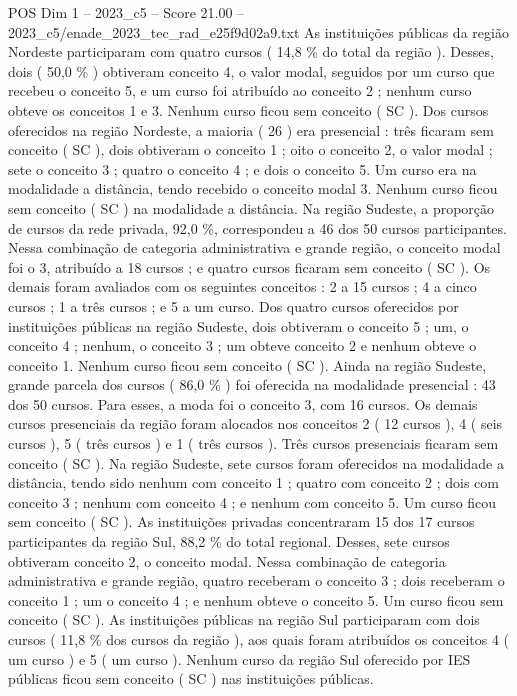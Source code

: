 \begin{textsample}{POS Dim 1 – 2023\_c5 – Score 21.00 – 2023\_c5/enade\_2023\_tec\_rad\_e25f9d02a9.txt}
As instituições públicas da região Nordeste participaram com quatro cursos ( 14,8 \% do total da região ).
Desses, dois ( 50,0 \% ) obtiveram conceito 4, o valor modal, seguidos por um curso que recebeu o conceito 5, e um curso foi atribuído ao conceito 2 ; nenhum curso obteve os conceitos 1 e 3.
Nenhum curso ficou sem conceito ( SC ).
Dos cursos oferecidos na região Nordeste, a maioria ( 26 ) era presencial : três ficaram sem conceito ( SC ), dois obtiveram o conceito 1 ; oito o conceito 2, o valor modal ; sete o conceito 3 ; quatro o conceito 4 ; e dois o conceito 5.
Um curso era na modalidade a distância, tendo recebido o conceito modal 3.
Nenhum curso ficou sem conceito ( SC ) na modalidade a distância.
Na região Sudeste, a proporção de cursos da rede privada, 92,0 \%, correspondeu a 46 dos 50 cursos participantes.
Nessa combinação de categoria administrativa e grande região, o conceito modal foi o 3, atribuído a 18 cursos ; e quatro cursos ficaram sem conceito ( SC ).
Os demais foram avaliados com os seguintes conceitos : 2 a 15 cursos ; 4 a cinco cursos ; 1 a três cursos ; e 5 a um curso.
Dos quatro cursos oferecidos por instituições públicas na região Sudeste, dois obtiveram o conceito 5 ; um, o conceito 4 ; nenhum, o conceito 3 ; um obteve conceito 2 e nenhum obteve o conceito 1.
Nenhum curso ficou sem conceito ( SC ).
Ainda na região Sudeste, grande parcela dos cursos ( 86,0 \% ) foi oferecida na modalidade presencial : 43 dos 50 cursos.
Para esses, a moda foi o conceito 3, com 16 cursos.
Os demais cursos presenciais da região foram alocados nos conceitos 2 ( 12 cursos ), 4 ( seis cursos ), 5 ( três cursos ) e 1 ( três cursos ).
Três cursos presenciais ficaram sem conceito ( SC ).
Na região Sudeste, sete cursos foram oferecidos na modalidade a distância, tendo sido nenhum com conceito 1 ; quatro com conceito 2 ; dois com conceito 3 ; nenhum com conceito 4 ; e nenhum com conceito 5.
Um curso ficou sem conceito ( SC ).
As instituições privadas concentraram 15 dos 17 cursos participantes da região Sul, 88,2 \% do total regional.
Desses, sete cursos obtiveram conceito 2, o conceito modal.
Nessa combinação de categoria administrativa e grande região, quatro receberam o conceito 3 ; dois receberam o conceito 1 ; um o conceito 4 ; e nenhum obteve o conceito 5.
Um curso ficou sem conceito ( SC ).
As instituições públicas na região Sul participaram com dois cursos ( 11,8 \% dos cursos da região ), aos quais foram atribuídos os conceitos 4 ( um curso ) e 5 ( um curso ).
Nenhum curso da região Sul oferecido por IES públicas ficou sem conceito ( SC ) nas instituições públicas.

\end{textsample}
